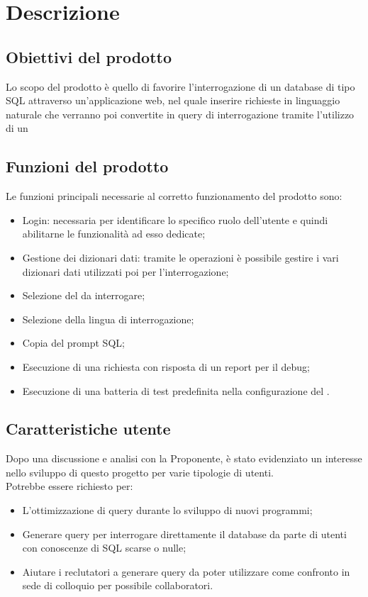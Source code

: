 \section{Descrizione}

\subsection{Obiettivi del prodotto}
Lo scopo del prodotto è quello di favorire l’interrogazione di un database di tipo SQL attraverso un’applicazione web, nel quale inserire richieste in linguaggio naturale che verranno poi convertite in query di interrogazione tramite l’utilizzo di un 

\subsection{Funzioni del prodotto}
Le funzioni principali necessarie al corretto funzionamento del prodotto sono:
\begin{itemize}
  \item Login: necessaria per identificare lo specifico ruolo dell’utente e quindi abilitarne le funzionalità ad esso dedicate;
  \item Gestione dei dizionari dati: tramite le operazioni  è possibile gestire i vari dizionari dati utilizzati poi per l’interrogazione;
  \item Selezione del  da interrogare;
  \item Selezione della lingua di interrogazione;
  \item Copia del prompt SQL;
  \item Esecuzione di una richiesta con risposta di un report per il debug;
  \item Esecuzione di una batteria di test predefinita nella configurazione del .
\end{itemize}

\subsection{Caratteristiche utente}
Dopo una discussione e analisi con la Proponente, è stato evidenziato un interesse nello sviluppo di questo progetto per varie tipologie di utenti.\\
Potrebbe essere richiesto per:
\begin{itemize}
  \item L'ottimizzazione di query durante lo sviluppo di nuovi programmi;
  \item Generare query per interrogare direttamente il database da parte di utenti con conoscenze di SQL scarse o nulle;
  \item Aiutare i reclutatori a generare query da poter utilizzare come confronto in sede di colloquio per possibile collaboratori.
\end{itemize}

